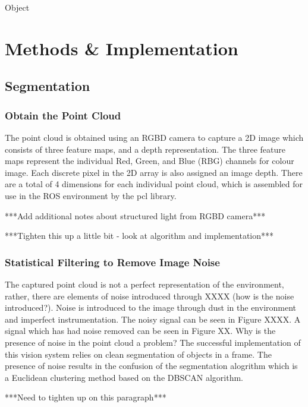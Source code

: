 \documentclass[a4paper]{article}
\begin{document}
Object



\newpage

\section{Methods \& Implementation}
\subsection{Segmentation}
\subsubsection{Obtain the Point Cloud}
The point cloud is obtained using an RGBD camera to capture a 2D image which consists of three feature maps, and a depth representation. The three feature maps represent the individual Red, Green, and Blue (RBG) channels for colour image. Each discrete pixel in the 2D array is also assigned an image depth. There are a total of 4 dimensions for each individual point cloud, which is assembled for use in the ROS environment by the pcl library.
 
***Add additional notes about structured light from RGBD camera***

***Tighten this up a little bit - look at algorithm and implementation***

\subsubsection{Statistical Filtering to Remove Image Noise}
The captured point cloud is not a perfect representation of the environment, rather, there are elements of noise introduced through XXXX (how is the noise introduced?). Noise is introduced to the image through dust in the environment and imperfect instrumentation. The noisy signal can be seen in Figure XXXX. A signal which has had noise removed can be seen in Figure XX. Why is the presence of noise in the point cloud a problem? The successful implementation of this vision system relies on clean segmentation of objects in a frame. The presence of noise results in the confusion of the segmentation alogrithm which is a Euclidean clustering method based on the DBSCAN algorithm.

***Need to tighten up on this paragraph***
\end{document}
